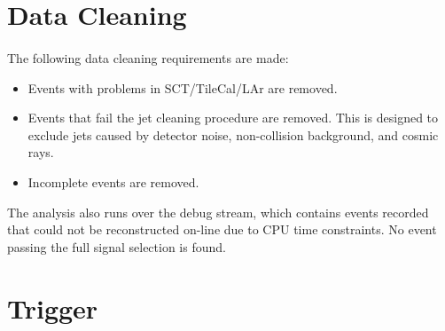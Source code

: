 \section{Data Cleaning}
\label{evt-sel:cleaning}
\paragraph{}
The following data cleaning requirements are made:
\begin{itemize}
\item Events with problems in SCT/TileCal/LAr are removed.
\item Events that fail the jet cleaning procedure are removed. This is designed to exclude jets caused by detector noise, non-collision background, and cosmic rays. 
\item Incomplete events are removed.
\end{itemize}
The analysis also runs over the debug stream, which contains events recorded that could not be reconstructed on-line due to CPU time constraints. 
No event passing the full signal selection is found.

\section{Trigger}
\label{evt-sel:trig}

